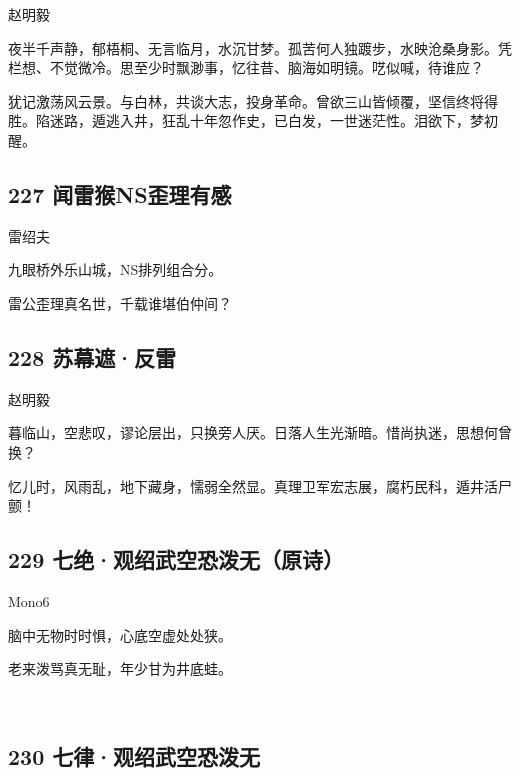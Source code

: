 {赵明毅}

夜半千声静，郁梧桐、无言临月，水沉甘梦。孤苦何人独踱步，水映沧桑身影。凭栏想、不觉微冷。思至少时飘渺事，忆往昔、脑海如明镜。呓似喊，待谁应？

犹记激荡风云景。与白林，共谈大志，投身革命。曾欲三山皆倾覆，坚信终将得胜。陷迷路，遁逃入井，狂乱十年忽作史，已白发，一世迷茫性。泪欲下，梦初醒。

\hypertarget{ux95fbux96f7ux7334nsux6b6aux7406ux6709ux611f}{%
\subsection{227
闻雷猴NS歪理有感}\label{ux95fbux96f7ux7334nsux6b6aux7406ux6709ux611f}}

{雷绍夫}

九眼桥外乐山城，NS排列组合分。

雷公歪理真名世，千载谁堪伯仲间？

\hypertarget{ux82cfux5e55ux906eux53cdux96f7}{%
\subsection{228 苏幕遮·反雷}\label{ux82cfux5e55ux906eux53cdux96f7}}

{赵明毅}

暮临山，空悲叹，谬论层出，只换旁人厌。日落人生光渐暗。惜尚执迷，思想何曾换？

忆儿时，风雨乱，地下藏身，懦弱全然显。真理卫军宏志展，腐朽民科，遁井活尸颤！

\hypertarget{ux4e03ux7eddux89c2ux7ecdux6b66ux7a7aux6050ux6cfcux65e0ux539fux8bd7}{%
\subsection{229
七绝·观绍武空恐泼无（原诗）}\label{ux4e03ux7eddux89c2ux7ecdux6b66ux7a7aux6050ux6cfcux65e0ux539fux8bd7}}

{Mono6}

脑中无物时时惧，心底空虚处处狭。

老来泼骂真无耻，年少甘为井底蛙。

~\\

\hypertarget{ux4e03ux5f8bux89c2ux7ecdux6b66ux7a7aux6050ux6cfcux65e0}{%
\subsection{230
七律·观绍武空恐泼无}\label{ux4e03ux5f8bux89c2ux7ecdux6b66ux7a7aux6050ux6cfcux65e0}}

